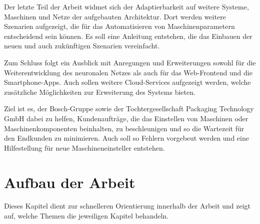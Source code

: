 Der letzte Teil der Arbeit widmet sich der Adaptierbarkeit auf weitere Systeme, Maschinen und Netze der aufgebauten
Architektur. Dort werden weitere Szenarien aufgezeigt, die für das Automatisieren von Maschinenparametern entscheidend
sein können. Es soll eine Anleitung entstehen, die das Einbauen der neuen und auch zukünftigen Szenarien vereinfacht.

Zum Schluss folgt ein Ausblick mit Anregungen und Erweiterungen sowohl für die Weiterentwicklung des neuronalen Netzes
als auch für das Web-Frontend und die Smartphone-Apps. Auch sollen weitere Cloud-Services aufgezeigt werden, welche
zusätzliche Möglichkeiten zur Erweiterung des Systems bieten.

Ziel ist es, der Bosch-Gruppe sowie der Tochtergesellschaft Packaging Technology GmbH dabei zu helfen, Kundenaufträge,
die das Einstellen von Maschinen oder Maschinenkomponenten beinhalten, zu beschleunigen und so die Wartezeit für den
Endkunden zu minimieren. Auch soll so Fehlern vorgebeut werden und eine Hilfestellung für neue Maschineneinsteller
entstehen.

\newpage

\section{Aufbau der Arbeit}
\label{sec:aufbauDerArbeit}
Dieses Kapitel dient zur schnelleren Orientierung innerhalb der Arbeit und zeigt auf, welche Themen die jeweiligen
Kapitel behandeln.

